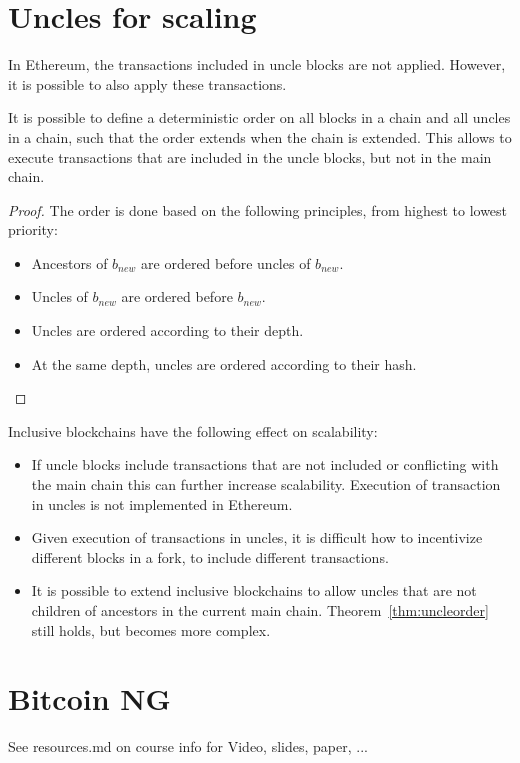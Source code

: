 \section{Uncles for scaling}
In Ethereum, the transactions included in uncle blocks are not applied. However, it is possible to also apply these transactions.

\begin{theorem}
	\label{thm:uncleorder}
It is possible to define a deterministic order on all blocks in a chain and all uncles in a chain, such that the order extends when the chain is extended.
This allows to execute transactions that are included in the uncle blocks, but not in the main chain.
\end{theorem}

\begin{proof}
	The order is done based on the following principles, from highest to lowest priority:
	\begin{itemize}
		\item Ancestors of $b_{new}$ are ordered before uncles of $b_{new}$.
		\item Uncles of $b_{new}$ are ordered before $b_{new}$.
		\item Uncles are ordered according to their depth.
		\item At the same depth, uncles are ordered according to their hash.
	\end{itemize}
\end{proof}

\begin{note}
Inclusive blockchains have the following effect on scalability:
\begin{itemize}
	\item If uncle blocks include transactions that are not included or conflicting with the main chain this can further increase scalability. Execution of transaction in uncles is not implemented in Ethereum.
	\item Given execution of transactions in uncles, it is difficult how to incentivize different blocks in a fork, to include different transactions.
	\item It is possible to extend inclusive blockchains to allow uncles that are not children of ancestors in the current main chain. Theorem~\ref{thm:uncleorder} still holds, but becomes more complex.
\end{itemize}
\end{note}

\section{Bitcoin NG}
See resources.md on course info for Video, slides, paper, ...

